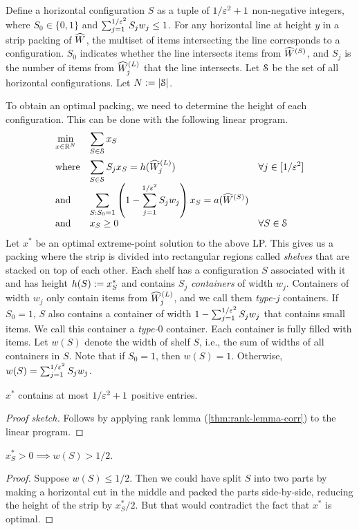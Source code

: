 Define a horizontal configuration $S$ as a tuple of $1/\varepsilon^2+1$ non-negative integers,
where $S_0 \in \{0, 1\}$ and $\sum_{j=1}^{1/\varepsilon^2} S_jw_j \le 1$.
For any horizontal line at height $y$ in a strip packing of $\widehat{W}$,
the multiset of items intersecting the line corresponds to a configuration.
$S_0$ indicates whether the line intersects items from $\widehat{W}^{(S)}$,
and $S_j$ is the number of items from $\widehat{W}^{(L)}_j$ that the line intersects.
Let $\mathcal{S}$ be the set of all horizontal configurations. Let $N := |\mathcal{S}|$.

To obtain an optimal packing, we need to determine the height of each configuration.
This can be done with the following linear program.
\[ \optprog{\min_{x \in \mathbb{R}^N}}{\sum_{S \in \Scal} x_S}{
\\[1.5em] \textrm{where} & \sum_{S \in \Scal} S_jx_S = h(\WhatLarge_j)
    & \forall j \in [1/\eps^2]
\\ \textrm{and} & \sum_{S: S_0=1} \left(1 - \sum_{j=1}^{1/\eps^2}S_jw_j\right)x_S
    = a(\WhatSmall)
\\ \textrm{and} & x_S \ge 0 & \forall S \in \Scal
} \]
Let $x^*$ be an optimal extreme-point solution to the above LP.
This gives us a packing where the strip is divided into rectangular regions
called \emph{shelves} that are stacked on top of each other.
Each shelf has a configuration $S$ associated with it
and has height $h(S) := x^*_S$ and contains $S_j$ \emph{containers} of width $w_j$.
Containers of width $w_j$ only contain items from $\widehat{W}^{(L)}_j$,
and we call them \emph{type-$j$} containers.
If $S_0 = 1$, $S$ also contains a container of width $1 - \sum_{j=1}^{1/\varepsilon^2} S_jw_j$
that contains small items. We call this container a \emph{type-$0$} container.
Each container is fully filled with items.
Let $w(S)$ denote the width of shelf $S$, i.e., the sum of widths of all containers in $S$.
Note that if $S_0 = 1$, then $w(S) = 1$. Otherwise, $w(S) = \sum_{j=1}^{1/\varepsilon^2} S_jw_j$.

\begin{lemma}
\label{thm:nonneg-entries}
$x^*$ contains at most $1/\varepsilon^2+1$ positive entries.
\end{lemma}
\begin{proof}[Proof sketch]
Follows by applying rank lemma (\cref{thm:rank-lemma-corr}) to the linear program.
\end{proof}

\begin{lemma}
$x_S^* > 0 \implies w(S) > 1/2$.
\end{lemma}
\begin{proof}
Suppose $w(S) \le 1/2$. Then we could have split $S$ into two parts by making a horizontal cut
in the middle and packed the parts side-by-side, reducing the height of the strip by $x^*_S/2$.
But that would contradict the fact that $x^*$ is optimal.
\end{proof}


